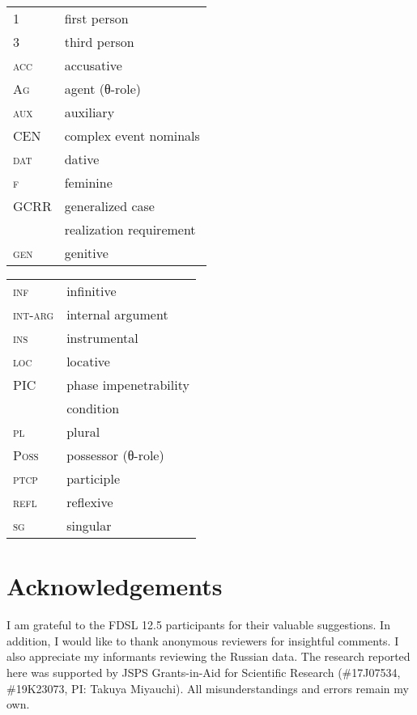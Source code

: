 \documentclass[output=paper,colorlinks,citecolor=brown,newtxmath]{langsci/langscibook}
\begin{document}
\begin{tabularx}{.5\textwidth}{lX}
1 & first person \\
3 & third person\\
\textsc{acc} & {accusative} \\
\textsc{Ag} & agent (θ-role) \\
\textsc{aux} & auxiliary \\
{CEN} & complex {event} nominals \\
\textsc{dat} & {dative} \\
\textsc{f} & feminine \\
{GCRR} & generalized case \\
 &realization requirement \\
\textsc{gen} & genitive  \\
\end{tabularx}
\begin{tabularx}{.45\textwidth}{lX}
\textsc{inf} & {infinitive} \\
\textsc{int-arg} & {internal argument} \\
\textsc{ins} & instrumental \\
\textsc{loc} & locative  \\
{PIC} & phase impenetrability\\
&condition \\
\textsc{pl} & plural \\
\textsc{Poss} & {possessor} (θ-role) \\
\textsc{ptcp} & {participle} \\
\textsc{refl}&{reflexive} \\
\textsc{sg} & singular \\
\end{tabularx}



\section*{Acknowledgements}
	I am grateful to the FDSL 12.5 participants for their valuable suggestions. In addition, I would like to thank anonymous reviewers for insightful comments. I also appreciate my informants reviewing the Russian data. The research reported here was supported by JSPS Grants-in-Aid for Scientific Research (\#17J07534, \#19K23073, PI: Takuya Miyauchi). All misunderstandings and errors remain my own.

\sloppy
\printbibliography[heading=subbibliography,notkeyword=this]
\end{document}
